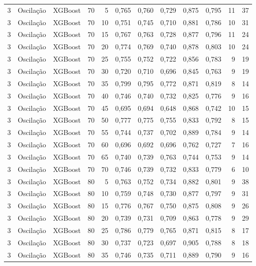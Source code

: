 \begin{longtable}{@{}rllrrrrrrrrr@{}}
3 & Oscilação & XGBoost & 70 & 5 & 0,765 & 0,760 & 0,729 & 0,875 & 0,795 & 11 & 37 \\
3 & Oscilação & XGBoost & 70 & 10 & 0,751 & 0,745 & 0,710 & 0,881 & 0,786 & 10 & 31 \\
3 & Oscilação & XGBoost & 70 & 15 & 0,767 & 0,763 & 0,728 & 0,877 & 0,796 & 11 & 24 \\
3 & Oscilação & XGBoost & 70 & 20 & 0,774 & 0,769 & 0,740 & 0,878 & 0,803 & 10 & 24 \\
3 & Oscilação & XGBoost & 70 & 25 & 0,755 & 0,752 & 0,722 & 0,856 & 0,783 & 9 & 19 \\
3 & Oscilação & XGBoost & 70 & 30 & 0,720 & 0,710 & 0,696 & 0,845 & 0,763 & 9 & 19 \\
3 & Oscilação & XGBoost & 70 & 35 & 0,799 & 0,795 & 0,772 & 0,871 & 0,819 & 8 & 14 \\
3 & Oscilação & XGBoost & 70 & 40 & 0,746 & 0,740 & 0,732 & 0,825 & 0,776 & 9 & 16 \\
3 & Oscilação & XGBoost & 70 & 45 & 0,695 & 0,694 & 0,648 & 0,868 & 0,742 & 10 & 15 \\
3 & Oscilação & XGBoost & 70 & 50 & 0,777 & 0,775 & 0,755 & 0,833 & 0,792 & 8 & 15 \\
3 & Oscilação & XGBoost & 70 & 55 & 0,744 & 0,737 & 0,702 & 0,889 & 0,784 & 9 & 14 \\
3 & Oscilação & XGBoost & 70 & 60 & 0,696 & 0,692 & 0,696 & 0,762 & 0,727 & 7 & 16 \\
3 & Oscilação & XGBoost & 70 & 65 & 0,740 & 0,739 & 0,763 & 0,744 & 0,753 & 9 & 14 \\
3 & Oscilação & XGBoost & 70 & 70 & 0,746 & 0,739 & 0,732 & 0,833 & 0,779 & 6 & 10 \\
3 & Oscilação & XGBoost & 80 & 5 & 0,763 & 0,752 & 0,734 & 0,882 & 0,801 & 9 & 38 \\
3 & Oscilação & XGBoost & 80 & 10 & 0,759 & 0,748 & 0,730 & 0,877 & 0,797 & 9 & 31 \\
3 & Oscilação & XGBoost & 80 & 15 & 0,776 & 0,767 & 0,750 & 0,875 & 0,808 & 9 & 26 \\
3 & Oscilação & XGBoost & 80 & 20 & 0,739 & 0,731 & 0,709 & 0,863 & 0,778 & 9 & 29 \\
3 & Oscilação & XGBoost & 80 & 25 & 0,786 & 0,779 & 0,765 & 0,871 & 0,815 & 8 & 17 \\
3 & Oscilação & XGBoost & 80 & 30 & 0,737 & 0,723 & 0,697 & 0,905 & 0,788 & 8 & 18 \\
3 & Oscilação & XGBoost & 80 & 35 & 0,746 & 0,735 & 0,711 & 0,889 & 0,790 & 9 & 16 \\

\end{longtable}
